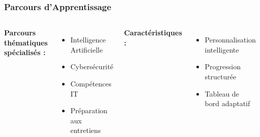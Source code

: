 \documentclass{beamer}
\begin{document}
\begin{frame}
\frametitle{Parcours d'Apprentissage}
\begin{columns}
\textbf{Parcours thématiques spécialisés :}
\begin{itemize}
    \item Intelligence Artificielle
    \item Cybersécurité
    \item Compétences IT
    \item Préparation aux entretiens
\end{itemize}
\textbf{Caractéristiques :}
\begin{itemize}
    \item Personnalisation intelligente
    \item Progression structurée
    \item Tableau de bord adaptatif
\end{itemize}

\begin{center}
    \includegraphics[width=\textwidth,height=5cm,keepaspectratio]{old-reports/week_4_img/learnpath.jpeg}
\end{center}
\end{columns}
\end{frame}
\end{document}
